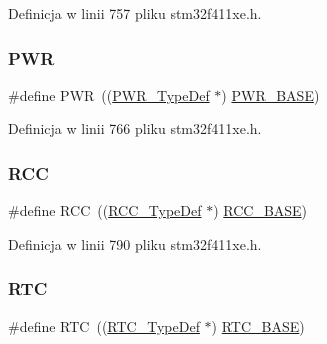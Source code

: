 Definicja w linii 757 pliku stm32f411xe.\+h.

\mbox{\label{group___peripheral__declaration_ga04651c526497822a859942b928e57f8e}} 
\subsubsection{\texorpdfstring{P\+WR}{PWR}}
{\footnotesize\ttfamily \#define P\+WR~((\hyperlink{struct_p_w_r___type_def}{P\+W\+R\+\_\+\+Type\+Def} $\ast$) \hyperlink{group___peripheral__memory__map_gac691ec23dace8b7a649a25acb110217a}{P\+W\+R\+\_\+\+B\+A\+SE})}



Definicja w linii 766 pliku stm32f411xe.\+h.

\mbox{\label{group___peripheral__declaration_ga74944438a086975793d26ae48d5882d4}} 
\subsubsection{\texorpdfstring{R\+CC}{RCC}}
{\footnotesize\ttfamily \#define R\+CC~((\hyperlink{struct_r_c_c___type_def}{R\+C\+C\+\_\+\+Type\+Def} $\ast$) \hyperlink{group___peripheral__memory__map_ga0e681b03f364532055d88f63fec0d99d}{R\+C\+C\+\_\+\+B\+A\+SE})}



Definicja w linii 790 pliku stm32f411xe.\+h.

\mbox{\label{group___peripheral__declaration_ga5359a088f5d8b20ce74d920e46059304}} 
\subsubsection{\texorpdfstring{R\+TC}{RTC}}
{\footnotesize\ttfamily \#define R\+TC~((\hyperlink{struct_r_t_c___type_def}{R\+T\+C\+\_\+\+Type\+Def} $\ast$) \hyperlink{group___peripheral__memory__map_ga4265e665d56225412e57a61d87417022}{R\+T\+C\+\_\+\+B\+A\+SE})}



